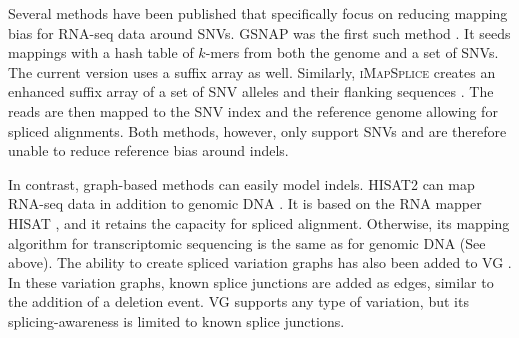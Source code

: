 Several methods have been published that specifically focus on reducing mapping bias for RNA-seq data around SNVs. 
\textsc{GSNAP} was the first such method \cite{Wu2010-hv}.
It seeds mappings with a hash table of $k$-mers from both the genome and a set of SNVs.
The current version uses a suffix array as well. 
Similarly, \textsc{iMapSplice} creates an enhanced suffix array of a set of SNV alleles and their flanking sequences \cite{Liu_2018}.
The reads are then mapped to the SNV index and the reference genome allowing for spliced alignments.
Both methods, however, only support SNVs and are therefore unable to reduce reference bias around indels.

In contrast, graph-based methods can easily model indels.
\textsc{HISAT2} can map RNA-seq data in addition to genomic DNA \cite{Kim_2019}.
It is based on the RNA mapper \textsc{HISAT} \cite{Kim_2015}, and it retains the capacity for spliced alignment.
Otherwise, its mapping algorithm for transcriptomic sequencing is the same as for genomic DNA (See above).
The ability to create spliced variation graphs has also been added to VG \cite{Garrison_2018}. 
In these variation graphs, known splice junctions are added as edges, similar to the addition of a deletion event.
\textsc{VG} supports any type of variation, but its splicing-awareness is limited to known splice junctions.




